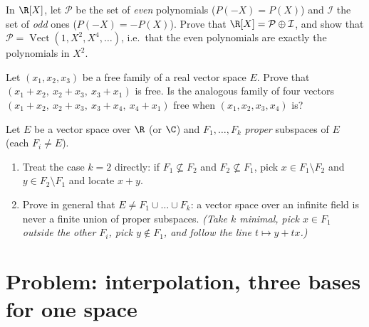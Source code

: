 \begin{exercise}[$\star\star$]\label{exo:b1:vspaces:10}
In $\R[X]$, let $\mathcal P$ be the set of \emph{even} polynomials
($P(-X) = P(X)$) and $\mathcal I$ the set of \emph{odd} ones
($P(-X) = -P(X)$). Prove that $\R[X] = \mathcal P \oplus \mathcal
I$, and show that $\mathcal P =
\operatorname{Vect}(1, X^2, X^4, \dots)$, i.e.\ that the even
polynomials are exactly the polynomials in $X^2$.
\end{exercise}

\begin{exercise}[$\star\star$]\label{exo:b1:vspaces:11}
Let $(x_1, x_2, x_3)$ be a free family of a real vector space $E$.
Prove that $(x_1 + x_2,\ x_2 + x_3,\ x_3 + x_1)$ is free. Is the
analogous family of four vectors $(x_1 + x_2,\ x_2 + x_3,\ x_3 +
x_4,\ x_4 + x_1)$ free when $(x_1, x_2, x_3, x_4)$ is?
\end{exercise}

\begin{exercise}[$\star\star\star$]\label{exo:b1:vspaces:12}
Let $E$ be a vector space over $\R$ (or $\C$) and $F_1, \dots,
F_k$ \emph{proper} subspaces of $E$ (each $F_i \neq E$).
\begin{enumerate}
  \item Treat the case $k = 2$ directly: if $F_1 \not\subseteq
        F_2$ and $F_2 \not\subseteq F_1$, pick $x \in F_1
        \setminus F_2$ and $y \in F_2 \setminus F_1$ and locate $x
        + y$.
  \item Prove in general that $E \neq F_1 \cup \dots \cup F_k$: a
        vector space over an infinite field is never a finite
        union of proper subspaces. \emph{(Take $k$ minimal, pick
        $x \in F_1$ outside the other $F_i$, pick $y \notin F_1$,
        and follow the line $t \mapsto y + tx$.)}
\end{enumerate}
\end{exercise}

\section{Problem: interpolation, three bases for one space}


